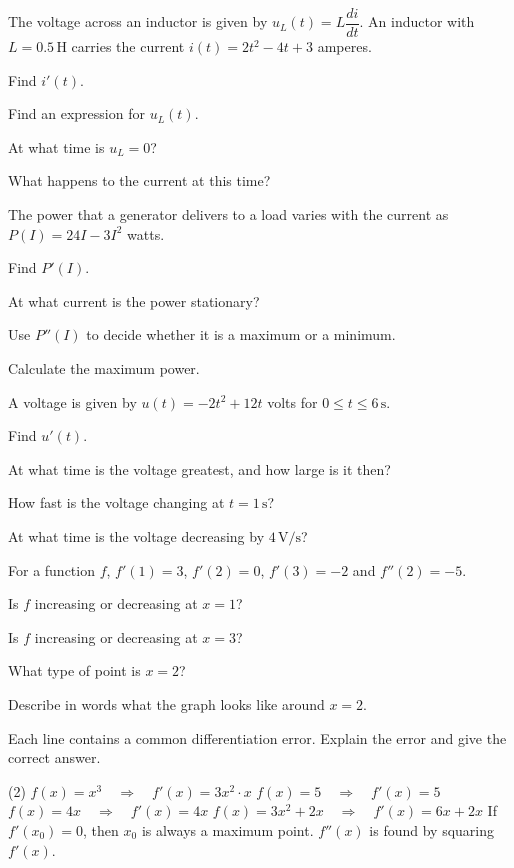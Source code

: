 The voltage across an inductor is given by $u_L(t) = L\dfrac{di}{dt}$. An inductor with
$L = 0.5\,\text{H}$ carries the current $i(t) = 2t^2 - 4t + 3$ amperes.
\begin{parts}
  \item Find $i'(t)$.
  \item Find an expression for $u_L(t)$.
  \item At what time is $u_L = 0$?
  \item What happens to the current at this time?
\end{parts}

The power that a generator delivers to a load varies with the current as
$P(I) = 24I - 3I^2$ watts.
\begin{parts}
  \item Find $P'(I)$.
  \item At what current is the power stationary?
  \item Use $P''(I)$ to decide whether it is a maximum or a minimum.
  \item Calculate the maximum power.
\end{parts}

A voltage is given by $u(t) = -2t^2 + 12t$ volts for $0 \leq t \leq 6\,\text{s}$.
\begin{parts}
  \item Find $u'(t)$.
  \item At what time is the voltage greatest, and how large is it then?
  \item How fast is the voltage changing at $t = 1\,\text{s}$?
  \item At what time is the voltage decreasing by $4\,\text{V/s}$?
\end{parts}

For a function $f$, $f'(1) = 3$, $f'(2) = 0$, $f'(3) = -2$ and $f''(2) = -5$.
\begin{parts}
  \item Is $f$ increasing or decreasing at $x = 1$?
  \item Is $f$ increasing or decreasing at $x = 3$?
  \item What type of point is $x = 2$?
  \item Describe in words what the graph looks like around $x = 2$.
\end{parts}

Each line contains a common differentiation error. Explain the error and give the correct answer.
\begin{delar}(2)
  \task $f(x) = x^3 \quad \Rightarrow \quad f'(x) = 3x^2 \cdot x$
  \task $f(x) = 5 \quad \Rightarrow \quad f'(x) = 5$
  \task $f(x) = 4x \quad \Rightarrow \quad f'(x) = 4x$
  \task $f(x) = 3x^2 + 2x \quad \Rightarrow \quad f'(x) = 6x + 2x$
  \task* If $f'(x_0) = 0$, then $x_0$ is always a maximum point.
  \task* $f''(x)$ is found by squaring $f'(x)$.
\end{delar}


